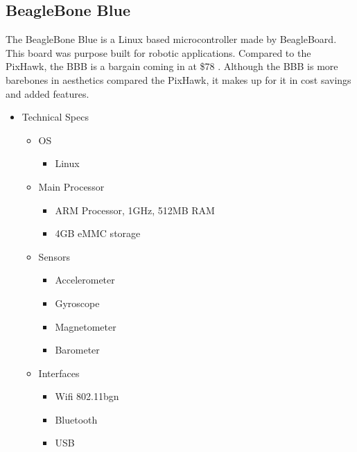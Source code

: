 \documentclass[onecolumn, 10pt, compsoc]{IEEEtran}
\begin{document}
\subsection{BeagleBone Blue}
The BeagleBone Blue is a Linux based microcontroller made by BeagleBoard. This board was purpose built for robotic applications. Compared to the PixHawk, the BBB is a bargain coming in at \$78 \cite{BeagleBoneBluePrice}. Although the BBB is more barebones in aesthetics compared the PixHawk, it makes up for it in cost savings and added features.
\begin{itemize}
    \item Technical Specs \cite{BeagleBoneBlueSpecs}
    \begin{itemize}
        \item OS
        \begin{itemize}
            \item Linux
        \end{itemize}
        \item Main Processor
        \begin{itemize}
            \item ARM Processor, 1GHz, 512MB RAM
            \item 4GB eMMC storage
        \end{itemize}
        \item Sensors
        \begin{itemize}
            \item Accelerometer
            \item Gyroscope
            \item Magnetometer
            \item Barometer
        \end{itemize}
        \item Interfaces
        \begin{itemize}
            \item Wifi 802.11bgn
            \item Bluetooth
            \item USB
        \end{itemize}
    \end{itemize}
\end{itemize}
\end{document}
